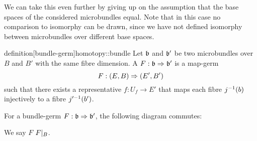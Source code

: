 \begin{myparagraph}
    We can take this even further by giving up on the assumption that the base spaces of the considered microbundles equal.
    Note that in this case no comparison to isomorphy can be drawn,
    since we have not defined isomorphy between microbundles over different base spaces.
\end{myparagraph}

\begin{mystatement}{definition}[bundle-germ]{homotopy::bundle}
    Let $\bb$ and $\bb'$ be two microbundles over $B$ and $B'$ with the same fibre dimension.
    A  $\germdef{F}{\bb}{\bb'}$ is a map-germ
    \[ F: (E, B) \Rightarrow{} (E', B') \]
    such that there exists a representative $f: U_f \to E'$ that maps each fibre $j^{-1}(b)$ injectively to a fibre $j'^{-1}(b')$.
\end{mystatement}

\begin{myparagraph}
    For a bundle-germ $\germdef{F}{\bb}{\bb'}$, the following diagram commutes:
    \begin{center}
    \end{center}
    We say $F$  $F\vert_{B}$.
\end{myparagraph}